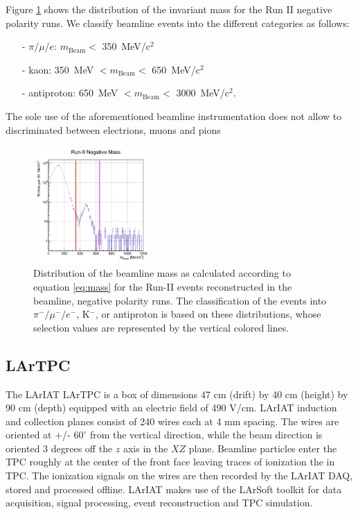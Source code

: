 \documentclass[aps,prl,twocolumn,showpacs,superscriptaddress,groupedaddress]{revtex4}  %
\begin{document}
Figure \ref{fig:mass} shows the distribution of the invariant mass for the Run II negative polarity runs. We classify beamline events into the different categories as follows:

\begin{itemize}
\item[-] $\pi/\mu/e$:  $m_{\text{Beam}}<$ 350~MeV/c$^2$
\item[-] kaon: 350~MeV $< m_{\text{Beam}} <$ 650~MeV/c$^2$
\item[-] antiproton: 650~MeV $<m_{\text{Beam}}<$ 3000~MeV/c$^2$.
\end{itemize}

The sole use of the aforementioned beamline instrumentation does not allow to discriminated between electrions, muons and pions

\begin{figure}
  \centering  
\includegraphics[width =0.4\textwidth]{massRunII.png}
\caption{Distribution of the beamline mass as calculated according to equation \ref{eq:mass} for the Run-II events reconstructed in the beamline, negative polarity runs. The classification of the events into $\pi^-/ \mu^-/e^-$, K$^-$, or antiproton is based on these distributions, whose selection values are represented by the vertical colored lines.}
\label{fig:mass}
\end{figure}


\subsection{\label{sec:LArTPC}LArTPC}

The LArIAT LArTPC is a box of dimensions 47 cm (drift) by 40 cm (height) by 90 cm (depth) equipped with an  electric field of 490 V/cm. LArIAT induction and collection planes consist of 240 wires each at 4 mm spacing. The wires are oriented at +/- $60^{\circ}$ from the vertical direction, while the beam direction is oriented 3 degrees off the $z$ axis in the $XZ$ plane.   Beamline particles enter the TPC roughly at the center of the front face leaving traces of ionization the in TPC. The ionization signals on the wires are then recorded by the LArIAT DAQ, stored and processed offline. LArIAT makes use of the LArSoft toolkit \cite{EricFChurck} for data acquisition, signal processing, event reconstruction and TPC simulation. 
\end{document}

